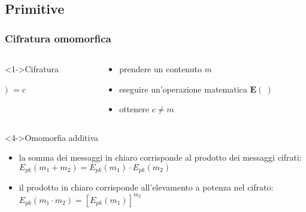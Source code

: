 \subsection{Primitive}
\begin{frame}
\frametitle{Cifratura omomorfica}
\begin{columns}[c]
\begin{column}{0.5\textwidth}
\begin{block}<1->{Cifratura}
\begin{center}
\Large  {}  $)$ $=c$
\end{center}
\end{block}
\end{column}
\begin{column}{0.5\textwidth}
\begin{itemize}
\item {} prendere un contenuto $m$
\item {} eseguire un'operazione matematica $\textbf{E}(\:)$
\item {} ottenere $ c \neq m $
\end{itemize}
\end{column}
\end{columns}
\vspace{12pt}
 \begin{block}<4->{Omomorfia additiva}
\begin{itemize}
				\item la somma dei messaggi in chiaro corrisponde al prodotto dei messaggi cifrati:\\
						\hspace{20pt} $E_{pk} (m_1 + m_2) = E_{pk} (m_1) \cdot E_{pk} (m_2)$
				\item il prodotto in chiaro corrisponde all'elevamento a potenza nel cifrato:\\
						\hspace{20pt} $E_{pk} (m_1 \cdot m_2) = [E_{pk} (m_1)]^{m_2}$
\end{itemize}
\end{block} 

\end{frame}


